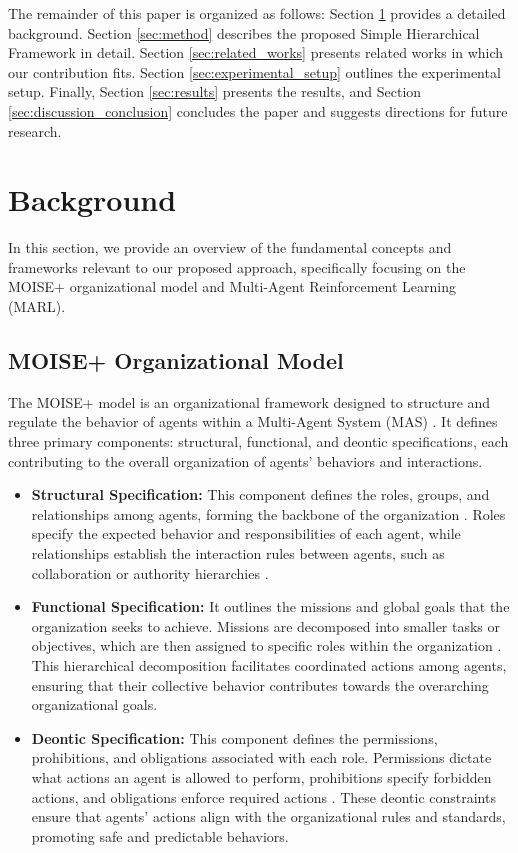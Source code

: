 \documentclass[sigconf,anonymous]{aamas}
\begin{document}
The remainder of this paper is organized as follows: Section \ref{sec:background} provides a detailed background. Section \ref{sec:method} describes the proposed Simple Hierarchical Framework in detail. Section \ref{sec:related_works} presents related works in which our contribution fits. Section \ref{sec:experimental_setup} outlines the experimental setup. Finally, Section \ref{sec:results} presents the results, and Section \ref{sec:discussion_conclusion} concludes the paper and suggests directions for future research.


\section{Background}
\label{sec:background}

In this section, we provide an overview of the fundamental concepts and frameworks relevant to our proposed approach, specifically focusing on the MOISE+ organizational model and Multi-Agent Reinforcement Learning (MARL).

\subsection{MOISE+ Organizational Model}
The MOISE+ model is an organizational framework designed to structure and regulate the behavior of agents within a Multi-Agent System (MAS) \cite{hubner2010moise}. It defines three primary components: structural, functional, and deontic specifications, each contributing to the overall organization of agents' behaviors and interactions.

\begin{itemize}
    \item \textbf{Structural Specification:} This component defines the roles, groups, and relationships among agents, forming the backbone of the organization \cite{hubner2007using}. Roles specify the expected behavior and responsibilities of each agent, while relationships establish the interaction rules between agents, such as collaboration or authority hierarchies \cite{castaneda2019policy}.
    \item \textbf{Functional Specification:} It outlines the missions and global goals that the organization seeks to achieve. Missions are decomposed into smaller tasks or objectives, which are then assigned to specific roles within the organization \cite{hernandez2019survey}. This hierarchical decomposition facilitates coordinated actions among agents, ensuring that their collective behavior contributes towards the overarching organizational goals.
    \item \textbf{Deontic Specification:} This component defines the permissions, prohibitions, and obligations associated with each role. Permissions dictate what actions an agent is allowed to perform, prohibitions specify forbidden actions, and obligations enforce required actions \cite{hubner2007using}. These deontic constraints ensure that agents' actions align with the organizational rules and standards, promoting safe and predictable behaviors.
\end{itemize}
\end{document}
